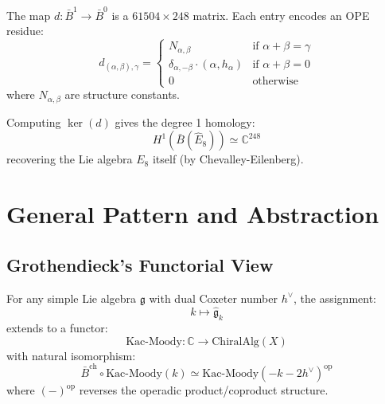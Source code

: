 \begin{example}
The map $d: \bar{B}^1 \to \bar{B}^0$ is a $61504 \times 248$ matrix. Each entry encodes an OPE residue:
$$d_{(\alpha,\beta),\gamma} = \begin{cases}
N_{\alpha,\beta} & \text{if } \alpha+\beta = \gamma \\
\delta_{\alpha,-\beta} \cdot (\alpha, h_\alpha) & \text{if } \alpha + \beta = 0 \\
0 & \text{otherwise}
\end{cases}$$
where $N_{\alpha,\beta}$ are structure constants.

Computing $\ker(d)$ gives the degree 1 homology:
$$H^1(\bar{B}(\widehat{E}_8)) \simeq \mathbb{C}^{248}$$
recovering the Lie algebra $E_8$ itself (by Chevalley-Eilenberg).
\end{example}

\section{General Pattern and Abstraction}

\subsection{Grothendieck's Functorial View}

\begin{theorem}
\label{thm:kac-moody-koszul-universal}
For any simple Lie algebra $\mathfrak{g}$ with dual Coxeter number $h^\vee$, the assignment:
$$k \mapsto \widehat{\mathfrak{g}}_k$$
extends to a functor:
$$\text{Kac-Moody}: \mathbb{C} \to \text{ChiralAlg}(X)$$
with natural isomorphism:
$$\bar{B}^{\text{ch}} \circ \text{Kac-Moody}(k) \simeq \text{Kac-Moody}(-k-2h^\vee)^{\text{op}}$$
where $(-)^{\text{op}}$ reverses the operadic product/coproduct structure.
\end{theorem}

